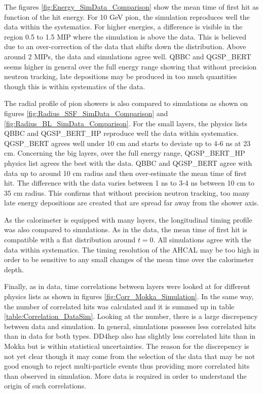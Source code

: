 The figures \ref{fig:Energy_SimData_Comparison} show the mean time of first hit as function of the hit energy. For 10 GeV pion, the simulation reproduces well the data within the systematics. For higher energies, a difference is visible in the region 0.5 to 1.5 MIP where the simulation is above the data. This is believed due to an over-correction of the data that shifts down the distribution. Above around 2 MIPs, the data and simulations agree well. QBBC and QGSP\_BERT seems higher in general over the full energy range showing that without precision neutron tracking, late depositions may be produced in too much quantities though this is within systematics of the data.

The radial profile of pion showers is also compared to simulations as shown on figures \ref{fig:Radius_SSF_SimData_Comparison} and \ref{fig:Radius_BL_SimData_Comparison}. For the small layers, the physics lists QBBC and QGSP\_BERT\_HP reproduce well the data within systematics. QGSP\_BERT agrees well under 10 cm and starts to deviate up to 4-6 ns at 23 cm. Concerning the big layers, over the full energy range, QGSP\_BERT\_HP physics list agrees the best with the data. QBBC and QGSP\_BERT agree with data up to around 10 cm radius and then over-estimate the mean time of first hit. The difference with the data varies between 1 ns to 3-4 ns between 10 cm to 35 cm radius. This confirms that without precision neutron tracking, too many late energy depositions are created that are spread far away from the shower axis.

As the calorimeter is equipped with many layers, the longitudinal timing profile was also compared to simulations. As in the data, the mean time of first hit is compatible with a flat distribution around $t=0$. All simulations agree with the data within systematics. The timing resolution of the AHCAL may be too high in order to be sensitive to any small changes of the mean time over the calorimeter depth.

Finally, as in data, time correlations between layers were looked at for different physics lists as shown in figures \ref{fig:Corr_Mokka_Simulation}. In the same way, the number of correlated hits was calculated and it is summed up in table \ref{table:Correlation_DataSim}. Looking at the number, there is a large discrepency between data and simulation. In general, simulations posseses less correlated hits than in data for both types. DD4hep also has slightly less correlated hits than in Mokka but is within statistical uncertainties. The reason for the discrepency is not yet clear though it may come from the selection of the data that may be not good enough to reject multi-particle events thus providing more correlated hits than observed in simulation. More data is required in order to understand the origin of such correlations.

